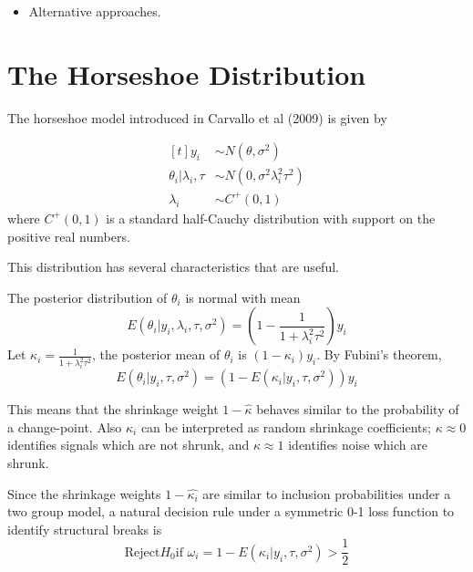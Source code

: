 \documentclass{article}
\begin{document}
\begin{itemize}
\item Alternative approaches. 
\end{itemize}

\section{The Horseshoe Distribution}

The horseshoe model introduced in Carvallo et al (2009) is given by 

\begin{equation}
  \label{eq:3}
  \begin{aligned}[t]
    y_{i} & \sim N(\theta, \sigma^{2}) \\
    \theta_{i} | \lambda_{i}, \tau & \sim N(0, \sigma^{2} \lambda_{i}^{2} \tau^{2}) \\
    \lambda_{i} & \sim C^{+}(0, 1)
  \end{aligned}
\end{equation}
where $C^{+}(0, 1)$ is a standard half-Cauchy distribution with support on the positive real numbers.

This distribution has several characteristics that are useful.

The posterior distribution of $\theta_{i}$ is normal with mean
\begin{equation}
  \label{eq:4}
  E(\theta_{i} | y_{i}, \lambda_{i}, \tau, \sigma^{2}) = \left( 1 - \frac{1}{1 + \lambda_{i}^{2} \tau^{2}} \right) y_{i}
\end{equation}
Let $\kappa_{i} = \frac{1}{1 + \lambda_{i}^{2} \tau^{2}}$, the posterior mean of $\theta_{i}$ is $(1 - \kappa_{i}) y_{i}$. 
By Fubini's theorem,
\begin{equation}
  \label{eq:7}
  E(\theta_{i} | y_{i}, \tau, \sigma^{2}) = \left(1 - E(\kappa_{i} | y_{i}, \tau, \sigma^{2 })\right)y_{i}
\end{equation}

This means that the shrinkage weight $1 - \hat{\kappa}$ behaves similar to the probability of a change-point.
Also $\kappa_{i}$ can be interpreted as random shrinkage coefficients; $\kappa \approx 0$ identifies signals which 
are not shrunk, and $\kappa \approx 1$ identifies noise which are shrunk.

Since the shrinkage weights $1 - \hat{\kappa_{i}}$ are similar to inclusion probabilities under a two group model, 
a natural decision rule under a symmetric 0-1 loss function to identify structural breaks is 
\begin{equation}
  \label{eq:5}
  \text{Reject} H_{0} \text{if $\omega_{i} = 1 - E(\kappa_{i} | y_{i}, \tau, \sigma^{2})$} > \frac{1}{2}
\end{equation}
\end{document}
